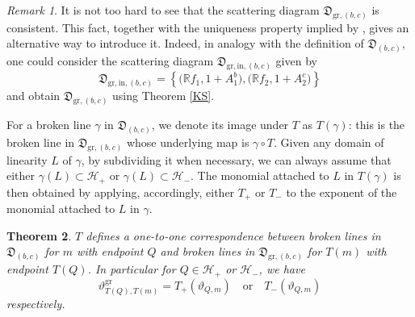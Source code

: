 \documentclass[12pt]{amsart}
\newtheorem{theorem}{Theorem}[section]
\theoremstyle{remark}
\newtheorem{remark}[theorem]{Remark}
\numberwithin{equation}{section}
\newcommand{\RR}{\mathbb{R}}
\newcommand{\DD}{\mathfrak{D}}
\newcommand{\gr}{\mathrm{gr}}
\begin{document}
\begin{remark}
  It is not too hard to see that the scattering diagram $\DD_{\gr,(b,c)}$ is
  consistent. This fact, together with the uniqueness property implied by
  \cite[Theorem 1.7]{GHKK}, gives an alternative way to introduce it. Indeed, in
  analogy with the definition of $\DD_{(b,c)}$, one could consider the
  scattering diagram
  $\DD_{\gr,\mathrm{in},(b,c)}$ given by
  \[
    \DD_{\gr,\mathrm{in},(b,c)}=
    \left\{
      \big(\RR f_1, 1+A_1^b\big), 
      \big(\RR f_2, 1+A_2^c\big)
    \right\}
  \]
  and obtain $\DD_{\gr,(b,c)}$ using Theorem \ref{KS}. 
\end{remark}

For a broken line $\gamma$ in $\DD_{(b,c)}$, we denote its image under $T$ as
$T(\gamma)$: this is the broken line in $\DD_{\gr,(b,c)}$ whose underlying map
is $\gamma\circ T$. Given any domain of linearity $L$ of $\gamma$, by
subdividing it when necessary, we can always assume that either $\gamma(L)
\subset \mathcal{H}_{+} $ or $\gamma(L)\subset \mathcal{H}_{-}$. The monomial
attached to $L$ in $T(\gamma)$ is then obtained by applying, accordingly, either
$T_+$ or $T_-$ to the exponent of the monomial attached to $L$ in $\gamma$.

\begin{theorem}
  \label{thm:T_on_broken_lines}
  $T$ defines a one-to-one correspondence between broken lines in $\DD_{(b,c)}$
  for $m$ with endpoint $Q$ and broken lines in $\DD_{\gr,(b,c)}$ for $T(m)$
  with endpoint $T(Q)$. In particular for $Q \in \mathcal{H}_+$ or $\mathcal{H}_-$,
  we have
  \[ 
    \vartheta^{\gr}_{T(Q),T( m)} = 
    T_{+} (\vartheta_{Q, m}) 
    \quad
    \mbox{or} 
    \quad
    T_{-} (\vartheta_{Q, m})
  \]
  respectively.
\end{theorem}
\end{document}
